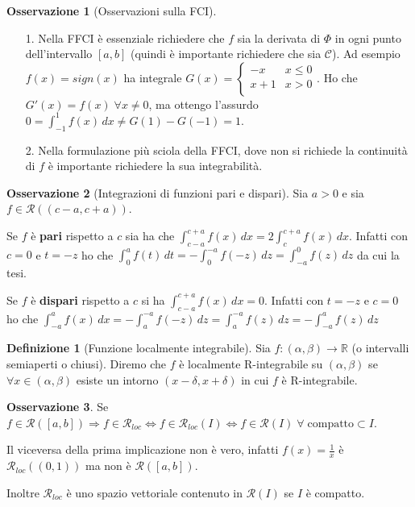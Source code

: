 \documentclass{article}
\theoremstyle{definition}
\theoremstyle{definition}
\theoremstyle{definition}
\newtheorem{definition}{Definizione}[section]
\theoremstyle{definition}
\newtheorem{remark}{Osservazione}[section]
\theoremstyle{definition}
\begin{document}
\begin{remark}[Osservazioni sulla FCI]
    \begin{enumerate}
        \item [1.] Nella FFCI è essenziale richiedere che $f$ sia la derivata di $\varPhi$ in ogni punto dell'intervallo $[a,b]$ (quindi è importante richiedere che sia $\mathcal{C}$). Ad esempio $f(x)=sign(x)$ ha integrale $G(x)=\begin{cases}
            -x & x \leq 0 \\
            x+1 & x>0\\
        \end{cases}$.
        Ho che $G'(x)=f(x) \; \forall x \neq 0$, ma ottengo l'assurdo $0=\int_{-1}^1f(x)\,dx \neq G(1)-G(-1)=1$.
        \item [2.] Nella formulazione più sciola della FFCI, dove non si richiede la continuità di $f$ è importante richiedere la sua integrabilità. 
    \end{enumerate}
\end{remark}

\begin{remark}[Integrazioni di funzioni pari e dispari]
    Sia $a>0$ e sia $f\in\mathcal{R}((c-a,c+a))$.

    Se $f$ è \textbf{pari} rispetto a $c$ sia ha che $\int_{c-a}^{c+a}f(x)\,dx=2\int_c^{c+a}f(x)\,dx$. Infatti con $c=0$ e $t=-z$ ho che $\int_0^af(t)\,dt=-\int_0^{-a}f(-z)\,dz=\int_{-a}^0f(z)\,dz$ da cui la tesi.

    Se $f$ è \textbf{dispari} rispetto a $c$ si ha $\int_{c-a}^{c+a}f(x)\,dx=0$. Infatti con $t=-z$ e $c=0$ ho che $\int_{-a}^{a}f(x)\,dx=-\int_a^{-a}f(-z)\,dz=\int_a^{-a}f(z)\,dz=-\int_{-a}^af(z)\,dz$
\end{remark}

\begin{definition}[Funzione localmente integrabile]
    Sia $f:(\alpha,\beta)\rightarrow \mathbb{R}$ (o intervalli semiaperti o chiusi). Diremo che $f$ è localmente R-integrabile su $(\alpha,\beta)$ se $\forall x \in (\alpha,\beta)$ esiste un intorno $(x-\delta,x+\delta)$ in cui $f$ è R-integrabile.
\end{definition}

\begin{remark}
    Se $f\in\mathcal{R}([a,b])\Rightarrow f\in\mathcal{R}_{loc} \Leftrightarrow f\in\mathcal{R}_{loc}(I) \Leftrightarrow f\in\mathcal{R}(I) \;\forall\; \text{compatto} \subset I$.

    Il viceversa della prima implicazione non è vero, infatti $f(x)=\frac{1}{x}$ è $\mathcal{R}_{loc}((0,1))$ ma non è $\mathcal{R}([a,b])$.

    Inoltre $\mathcal{R}_{loc}$ è uno spazio vettoriale contenuto in $\mathcal{R}(I)$ se $I$ è compatto.
\end{remark}
\end{document}
